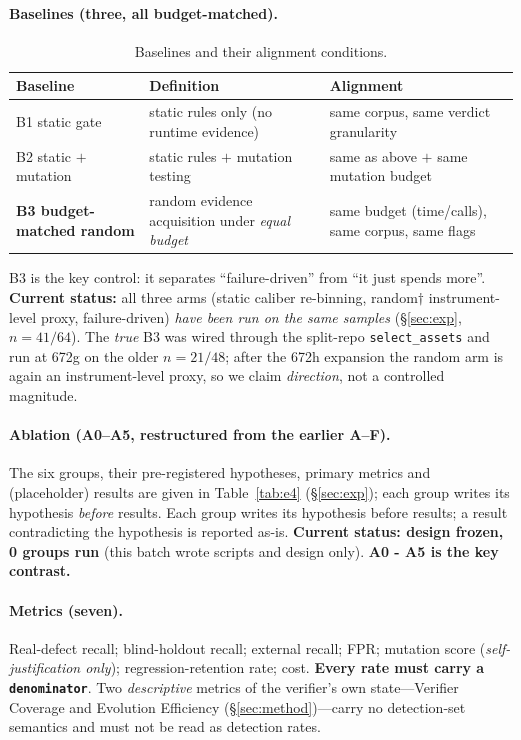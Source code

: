 \documentclass{article}
\begin{document}
\paragraph{Baselines (three, all budget-matched).}
\label{sec:baseline}
\begin{table}[t]
\caption{Baselines and their alignment conditions.}
\label{tab:baseline}
\centering
\footnotesize
\begin{tabular}{@{}lp{5.2cm}p{6.4cm}@{}}
\toprule
Baseline & Definition & Alignment \\
\midrule
B1 static gate & static rules only (no runtime evidence) & same corpus, same verdict granularity \\
B2 static $+$ mutation & static rules $+$ mutation testing & same as above $+$ same mutation budget \\
\textbf{B3 budget-matched random} & random evidence acquisition under \emph{equal budget} & same budget (time/calls), same corpus, same flags \\
\bottomrule
\end{tabular}
\end{table}
B3 is the key control: it separates ``failure-driven'' from ``it just spends more''.
\textbf{Current status:} all three arms (static caliber re-binning, random$\dagger$ instrument-level
proxy, failure-driven) \emph{have been run on the same samples} (\S\ref{sec:exp}, $n{=}41/64$).
The \emph{true} B3 was wired through the split-repo \texttt{select\_assets} and run at 672g on the
older $n{=}21/48$; after the 672h expansion the random arm is again an instrument-level proxy, so we
claim \emph{direction}, not a controlled magnitude.

\paragraph{Ablation (A0--A5, restructured from the earlier A--F).}
The six groups, their pre-registered hypotheses, primary metrics and (placeholder) results are given
in Table~\ref{tab:e4} (\S\ref{sec:exp}); each group writes its hypothesis \emph{before} results.
Each group writes its hypothesis before results; a result contradicting the hypothesis is reported
as-is. \textbf{Current status: design frozen, 0 groups run} (this batch wrote scripts and design
only). \textbf{A0 - A5 is the key contrast.}

\paragraph{Metrics (seven).} Real-defect recall; blind-holdout recall; external recall; FPR;
mutation score (\emph{self-justification only}); regression-retention rate; cost. \textbf{Every
rate must carry a \texttt{denominator}}. Two \emph{descriptive} metrics of the verifier's own
state---Verifier Coverage and Evolution Efficiency (\S\ref{sec:method})---carry no detection-set
semantics and must not be read as detection rates.
\end{document}
